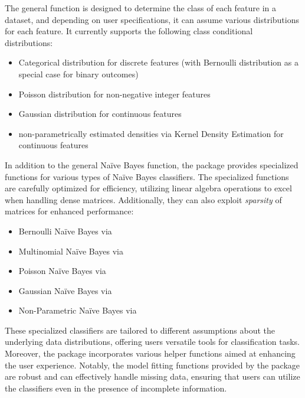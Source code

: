 \documentclass{article}\usepackage[]{graphicx}\usepackage[]{xcolor}
\begin{document}
The general \textcolor{darkgreen}{{}} function is designed to determine the class of each feature in a dataset, and depending on user specifications, it can assume various distributions for each feature. It currently supports the following class conditional distributions:

\begin{itemize}
  \item Categorical distribution for discrete features (with Bernoulli distribution as a special case for binary outcomes)
  \item Poisson distribution for non-negative integer features
  \item Gaussian distribution for continuous features
  \item non-parametrically estimated densities via Kernel Density Estimation for continuous features
\end{itemize}

In addition to the general Na\"ive Bayes function, the package provides specialized functions for various types of Na\"ive Bayes classifiers. The specialized functions are carefully optimized for efficiency, utilizing linear algebra operations to excel when handling dense matrices. Additionally, they can also exploit \emph{sparsity} of matrices for enhanced performance:

\begin{itemize}
 \item Bernoulli Na\"ive Bayes via \textcolor{darkgreen}{{}}
 \item Multinomial Na\"ive Bayes via \textcolor{darkgreen}{{}}
 \item Poisson Na\"ive Bayes via \textcolor{darkgreen}{{}}
 \item Gaussian Na\"ive Bayes via \textcolor{darkgreen}{{}}
 \item Non-Parametric Na\"ive Bayes via \textcolor{darkgreen}{{}}
\end{itemize}

These specialized classifiers are tailored to different assumptions about the underlying data distributions, offering users versatile tools for classification tasks. Moreover, the package incorporates various helper functions aimed at enhancing the user experience. Notably, the model fitting functions provided by the package are robust and can effectively handle missing data, ensuring that users can utilize the classifiers even in the presence of incomplete information.
\end{document}
